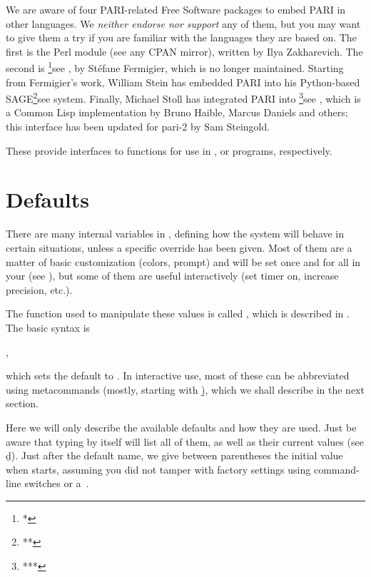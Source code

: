 We are aware of four PARI-related Free Software packages to embed PARI in
other languages. We \emph{neither endorse nor support} any of them, but you
may want to give them a try if you are familiar with the languages they are
based on. The first is the  Perl module (see any CPAN
mirror), written by Ilya Zakharevich. The second is %
\footnote{*}{see },
%
by St\'efane Fermigier, which is no longer maintained. Starting from
Fermigier's work, William Stein has embedded PARI into his Python-based
SAGE\footnote{**}{see }
system. Finally, Michael Stoll has integrated PARI into 
\footnote{***}{see }, which is a Common Lisp
implementation by Bruno Haible, Marcus Daniels and others; this interface has
been updated for pari-2 by Sam Steingold.

These provide interfaces to  functions for use in ,
 or  programs,
respectively.

\section{Defaults}
\label{se:defaults}

\noindent There are many internal variables in , defining how the
system will behave in certain situations, unless a specific override has been
given. Most of them are a matter of basic customization (colors, prompt) and
will be set once and for all in your  (see
), but some of them are useful interactively (set timer on,
increase precision, etc.).

The function used to manipulate these values is called , which
is described in . The basic syntax is

,

\noindent which sets the default  to . In interactive
use, most of these can be abbreviated using  metacommands
(mostly, starting with \b), which we shall describe in the next section.

Here we will only describe the available defaults and how they are used. Just
be aware that typing  by itself will list all of them, as well
as their current values (see \b{d}). Just after the default name, we give
between parentheses the initial value when  starts, assuming you did
not tamper with factory settings using command-line switches or a~.


